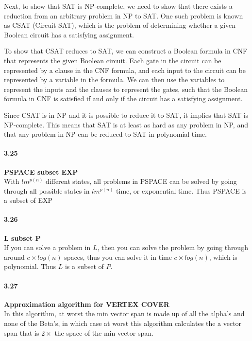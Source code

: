 Next, to show that SAT is NP-complete, we need to show that there exists a reduction from an arbitrary problem in NP to SAT. One such problem is known as CSAT (Circuit SAT), which is the problem of determining whether a given Boolean circuit has a satisfying assignment.

To show that CSAT reduces to SAT, we can construct a Boolean formula in CNF that represents the given Boolean circuit. Each gate in the circuit can be represented by a clause in the CNF formula, and each input to the circuit can be represented by a variable in the formula. We can then use the variables to represent the inputs and the clauses to represent the gates, such that the Boolean formula in CNF is satisfied if and only if the circuit has a satisfying assignment.

Since CSAT is in NP and it is possible to reduce it to SAT, it implies that SAT is NP-complete. This means that SAT is at least as hard as any problem in NP, and that any problem in NP can be reduced to SAT in polynomial time.

\paragraph{3.25} \textbf{PSPACE subset EXP}
\\

With $lm^{p(n)}$ different states, all problems in PSPACE can be solved by going through all possible states in $lm^{p(n)}$ time, or exponential time. Thus PSPACE is a subset of EXP

\paragraph{3.26} \textbf{L subset P}
\\

If you can solve a problem in $L$, then you can solve the problem by going through around $c \times log(n)$ spaces, thus you can solve it in time $c \times log(n)$, which is polynomial. Thus $L$ is a subset of $P$.

\paragraph{3.27} \textbf{Approximation algorithm for VERTEX COVER}
\\

In this algorithm, at worst the min vector span is made up of all the alpha’s and none of the Beta’s, in which case at worst this algorithm calculates the a vector span that is $2 \times$ the space of the min vector span.

